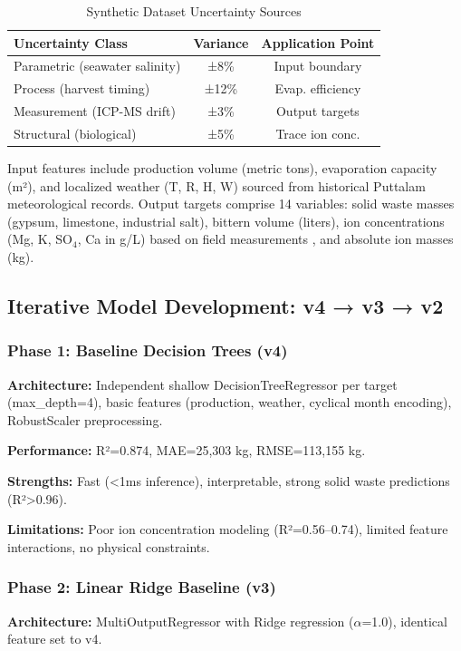 \documentclass[conference]{IEEEtran}
\begin{document}
\begin{table}[h]
\centering
\caption{Synthetic Dataset Uncertainty Sources}
\label{tab:uncertainty}
\begin{tabular}{lcc}
\toprule
\textbf{Uncertainty Class} & \textbf{Variance} & \textbf{Application Point} \\
\midrule
Parametric (seawater salinity) & ±8\% & Input boundary \\
Process (harvest timing) & ±12\% & Evap. efficiency \\
Measurement (ICP-MS drift) & ±3\% & Output targets \\
Structural (biological) & ±5\% & Trace ion conc. \\
\bottomrule
\end{tabular}
\end{table}

Input features include production volume (metric tons), evaporation capacity (m²), and localized weather (T, R, H, W) sourced from historical Puttalam meteorological records. Output targets comprise 14 variables: solid waste masses (gypsum, limestone, industrial salt), bittern volume (liters), ion concentrations (Mg, K, SO$_4$, Ca in g/L) based on field measurements \cite{perera2019,liyanage2021}, and absolute ion masses (kg).

\subsection{Iterative Model Development: v4 → v3 → v2}

\subsubsection{Phase 1: Baseline Decision Trees (v4)}
\textbf{Architecture:} Independent shallow DecisionTreeRegressor per target (max\_depth=4), basic features (production, weather, cyclical month encoding), RobustScaler preprocessing.

\textbf{Performance:} R²=0.874, MAE=25,303 kg, RMSE=113,155 kg.

\textbf{Strengths:} Fast (<1ms inference), interpretable, strong solid waste predictions (R²>0.96).

\textbf{Limitations:} Poor ion concentration modeling (R²=0.56–0.74), limited feature interactions, no physical constraints.

\subsubsection{Phase 2: Linear Ridge Baseline (v3)}
\textbf{Architecture:} MultiOutputRegressor with Ridge regression ($\alpha$=1.0), identical feature set to v4.
\end{document}
